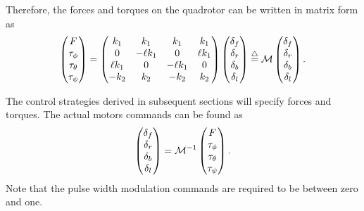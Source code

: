 {Therefore, the forces and torques on the quadrotor can be written in
matrix form as
\[
\begin{pmatrix}
    F \\
    \tau_{\phi} \\
    \tau_{\theta} \\
    \tau_{\psi}
\end{pmatrix} =
\begin{pmatrix}
    k_1 & k_1 & k_1 & k_1 \\
    0 & -\ell k_1 & 0 & \ell k_1 \\
    \ell k_1 & 0 & -\ell k_1 & 0 \\
    -k_2 & k_2 & -k_2 & k_2
\end{pmatrix}
\begin{pmatrix}
    \delta_f \\
    \delta_r \\
    \delta_b \\
    \delta_l
\end{pmatrix}
\stackrel{\triangle}{=} \mathcal{M}
\begin{pmatrix}
    \delta_f \\
    \delta_r \\
    \delta_b \\
    \delta_l
\end{pmatrix}.
\]

The control strategies derived in subsequent sections will specify
forces and torques.  The actual motors commands can be found as
\[
\begin{pmatrix}
    \delta_f \\
    \delta_r \\
    \delta_b \\
    \delta_l
\end{pmatrix}
= \mathcal{M}^{-1}\emph{}
\begin{pmatrix}
    F \\
    \tau_{\phi} \\
    \tau_{\theta} \\
    \tau_{\psi}
\end{pmatrix}.
\]
Note that the pulse width modulation commands are required to be
between zero and one.


}
